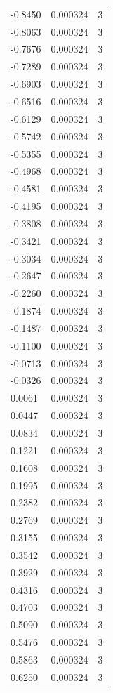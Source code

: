 \begin{longtable}{lrr}
  -0.8450 & 0.000324 & 3 \\
  -0.8063 & 0.000324 & 3 \\
  -0.7676 & 0.000324 & 3 \\
  -0.7289 & 0.000324 & 3 \\
  -0.6903 & 0.000324 & 3 \\
  -0.6516 & 0.000324 & 3 \\
  -0.6129 & 0.000324 & 3 \\
  -0.5742 & 0.000324 & 3 \\
  -0.5355 & 0.000324 & 3 \\
  -0.4968 & 0.000324 & 3 \\
  -0.4581 & 0.000324 & 3 \\
  -0.4195 & 0.000324 & 3 \\
  -0.3808 & 0.000324 & 3 \\
  -0.3421 & 0.000324 & 3 \\
  -0.3034 & 0.000324 & 3 \\
  -0.2647 & 0.000324 & 3 \\
  -0.2260 & 0.000324 & 3 \\
  -0.1874 & 0.000324 & 3 \\
  -0.1487 & 0.000324 & 3 \\
  -0.1100 & 0.000324 & 3 \\
  -0.0713 & 0.000324 & 3 \\
  -0.0326 & 0.000324 & 3 \\
  0.0061 & 0.000324 & 3 \\
  0.0447 & 0.000324 & 3 \\
  0.0834 & 0.000324 & 3 \\
  0.1221 & 0.000324 & 3 \\
  0.1608 & 0.000324 & 3 \\
  0.1995 & 0.000324 & 3 \\
  0.2382 & 0.000324 & 3 \\
  0.2769 & 0.000324 & 3 \\
  0.3155 & 0.000324 & 3 \\
  0.3542 & 0.000324 & 3 \\
  0.3929 & 0.000324 & 3 \\
  0.4316 & 0.000324 & 3 \\
  0.4703 & 0.000324 & 3 \\
  0.5090 & 0.000324 & 3 \\
  0.5476 & 0.000324 & 3 \\
  0.5863 & 0.000324 & 3 \\
  0.6250 & 0.000324 & 3 \\

\end{longtable}
